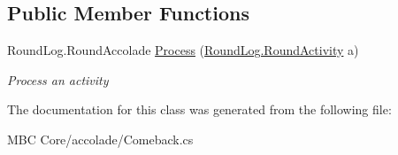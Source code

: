 \subsection*{Public Member Functions}
\begin{DoxyCompactItemize}
\item 
\hypertarget{class_m_b_c_1_1_core_1_1mbc_1_1accolade_1_1_comeback_a805182b1fd3ffde85c1e2cb5c56bc25a}{Round\-Log.\-Round\-Accolade \hyperlink{class_m_b_c_1_1_core_1_1mbc_1_1accolade_1_1_comeback_a805182b1fd3ffde85c1e2cb5c56bc25a}{Process} (\hyperlink{class_m_b_c_1_1_core_1_1_round_log_1_1_round_activity}{Round\-Log.\-Round\-Activity} a)}\label{class_m_b_c_1_1_core_1_1mbc_1_1accolade_1_1_comeback_a805182b1fd3ffde85c1e2cb5c56bc25a}

\begin{DoxyCompactList}\small\item\em Process an activity\end{DoxyCompactList}\end{DoxyCompactItemize}


The documentation for this class was generated from the following file\-:\begin{DoxyCompactItemize}
\item 
M\-B\-C Core/accolade/Comeback.\-cs\end{DoxyCompactItemize}
